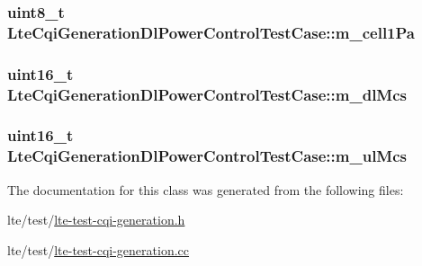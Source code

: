 \subsubsection[{\texorpdfstring{m\+\_\+cell1\+Pa}{m_cell1Pa}}]{\setlength{\rightskip}{0pt plus 5cm}uint8\+\_\+t Lte\+Cqi\+Generation\+Dl\+Power\+Control\+Test\+Case\+::m\+\_\+cell1\+Pa\hspace{0.3cm}{\ttfamily [private]}}\hypertarget{classLteCqiGenerationDlPowerControlTestCase_ad41f36391682d8a235fa343fc4fd98a8}{}\label{classLteCqiGenerationDlPowerControlTestCase_ad41f36391682d8a235fa343fc4fd98a8}
\subsubsection[{\texorpdfstring{m\+\_\+dl\+Mcs}{m_dlMcs}}]{\setlength{\rightskip}{0pt plus 5cm}uint16\+\_\+t Lte\+Cqi\+Generation\+Dl\+Power\+Control\+Test\+Case\+::m\+\_\+dl\+Mcs\hspace{0.3cm}{\ttfamily [private]}}\hypertarget{classLteCqiGenerationDlPowerControlTestCase_ab7c10c9532329875db92e9a17cf739ba}{}\label{classLteCqiGenerationDlPowerControlTestCase_ab7c10c9532329875db92e9a17cf739ba}
\subsubsection[{\texorpdfstring{m\+\_\+ul\+Mcs}{m_ulMcs}}]{\setlength{\rightskip}{0pt plus 5cm}uint16\+\_\+t Lte\+Cqi\+Generation\+Dl\+Power\+Control\+Test\+Case\+::m\+\_\+ul\+Mcs\hspace{0.3cm}{\ttfamily [private]}}\hypertarget{classLteCqiGenerationDlPowerControlTestCase_a8d8692ed37c7a9d98605af24a4d0c17d}{}\label{classLteCqiGenerationDlPowerControlTestCase_a8d8692ed37c7a9d98605af24a4d0c17d}


The documentation for this class was generated from the following files\+:\begin{DoxyCompactItemize}
\item 
lte/test/\hyperlink{lte-test-cqi-generation_8h}{lte-\/test-\/cqi-\/generation.\+h}\item 
lte/test/\hyperlink{lte-test-cqi-generation_8cc}{lte-\/test-\/cqi-\/generation.\+cc}\end{DoxyCompactItemize}

